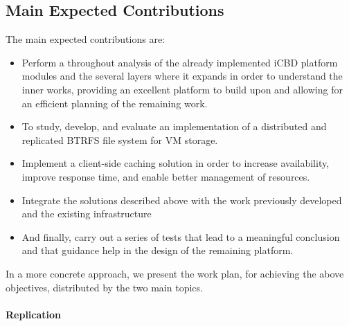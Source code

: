 


\subsection{Main Expected Contributions} %
\label{sub:intro_main_expected_contributions}

The main expected contributions are: 

\begin{itemize}
  \item Perform a throughout analysis of the already implemented iCBD platform modules and the several layers where it expands in order to understand the inner works, providing an excellent platform to build upon and allowing for an efficient planning of the remaining work. 
  \item To study, develop, and evaluate an implementation of a distributed and replicated BTRFS file system for VM storage.
  \item Implement a client-side caching solution in order to increase availability, improve response time, and enable better management of resources.
  \item Integrate the solutions described above  with the work previously developed and the existing infrastructure
  \item And finally, carry out a series of tests that lead to a meaningful conclusion and that guidance help in the design of the remaining platform.
\end{itemize}


In a more concrete approach, we present the work plan, for achieving the above objectives, distributed by the two main topics.


\paragraph{Replication}
\label{par:intro_replication_goals}

